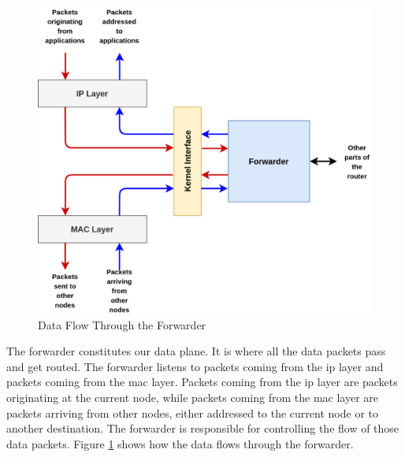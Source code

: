 \begin{figure}[!htb]
    \centering
    \includegraphics[width=0.9\linewidth]{images/forwarder-data-flow.png}
    \caption{Data Flow Through the Forwarder}
    \label{fig:forwarder-data-flow}
\end{figure}

The forwarder constitutes our data plane. It is where all the data packets pass and get routed. The forwarder listens to packets coming from the \acrshort{ip} layer and packets coming from the \acrshort{mac} layer. Packets coming from the \acrshort{ip} layer are packets originating at the current node, while packets coming from the \acrshort{mac} layer are packets arriving from other nodes, either addressed to the current node or to another destination. The forwarder is responsible for controlling the flow of those data packets. Figure \ref{fig:forwarder-data-flow} shows how the data flows through the forwarder.

